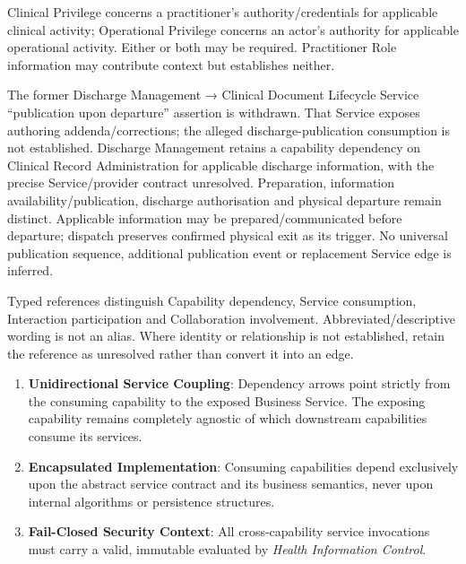 \label{rad:dependencies:81}

Clinical Privilege concerns a practitioner's authority/\allowbreak{}credentials for applicable clinical activity; Operational Privilege concerns an actor's authority for applicable operational activity. Either or both may be required. Practitioner Role information may contribute context but establishes neither.

\label{rad:dependencies:83}

The former Discharge Management → Clinical Document Lifecycle Service “publication upon departure” assertion is withdrawn. That Service exposes authoring addenda/\allowbreak{}corrections; the alleged discharge-publication consumption is not established. Discharge Management retains a capability dependency on Clinical Record Administration for applicable discharge information, with the precise Service/\allowbreak{}provider contract unresolved. Preparation, information availability/\allowbreak{}publication, discharge authorisation and physical departure remain distinct. Applicable information may be prepared/\allowbreak{}communicated before departure; \texttt{} dispatch preserves confirmed physical exit as its trigger. No universal publication sequence, additional publication event or replacement Service edge is inferred.

\label{rad:dependencies:85}

Typed references distinguish Capability dependency, Service consumption, Interaction participation and Collaboration involvement. Abbreviated/\allowbreak{}descriptive wording is not an alias. Where identity or relationship is not established, retain the reference as unresolved rather than convert it into an edge.

\label{rad:dependencies:87}

\begin{enumerate}

\item 
\textbf{Unidirectional Service Coupling}: Dependency arrows point strictly from the consuming capability to the exposed Business Service. The exposing capability remains completely agnostic of which downstream capabilities consume its services.



\item 
\textbf{Encapsulated Implementation}: Consuming capabilities depend exclusively upon the abstract service contract and its business semantics, never upon internal algorithms or persistence structures.



\item 
\textbf{Fail-Closed Security Context}: All cross-capability service invocations must carry a valid, immutable \texttt{} evaluated by \emph{Health Information Control}.



\end{enumerate}
\label{rad:dependencies:91}

